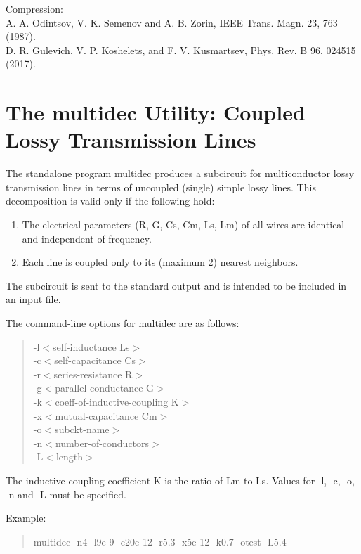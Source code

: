 Compression:\\
A. A. Odintsov, V. K. Semenov and A. B. Zorin, IEEE Trans. Magn. 23, 763
 (1987).\\
D. R. Gulevich, V. P. Koshelets, and F. V. Kusmartsev, Phys. Rev. B 96,
  024515 (2017).

\section{The {\vt multidec} Utility: Coupled Lossy Transmission Lines}


The standalone program {\vt multidec} produces a subcircuit for
multiconductor lossy transmission lines in terms of uncoupled (single)
simple lossy lines.  This decomposition is valid only if the following
hold:

\begin{enumerate}
\item{The electrical parameters (R, G, Cs, Cm, Ls, Lm) of all wires are
 identical and independent of frequency.}
\item{Each line is coupled only to its (maximum 2) nearest neighbors.}
\end{enumerate}

The subcircuit is sent to the standard output and is intended to be
included in an input file.

The command-line options for {\vt multidec} are as follows:
\begin{quote}
{\vt -l}$<$self-inductance Ls$>$\\
{\vt -c}$<$self-capacitance Cs$>$\\
{\vt -r}$<$series-resistance R$>$\\
{\vt -g}$<$parallel-conductance G$>$\\
{\vt -k}$<$coeff-of-inductive-coupling K$>$\\
{\vt -x}$<$mutual-capacitance Cm$>$\\
{\vt -o}$<$subckt-name$>$\\
{\vt -n}$<$number-of-conductors$>$\\
{\vt -L}$<$length$>$
\end{quote}

The inductive coupling coefficient K is the ratio of Lm
to Ls. Values for -l, -c, -o, -n and -L must be specified.

Example:
\begin{quote}
{\vt multidec -n4 -l9e-9 -c20e-12 -r5.3 -x5e-12 -k0.7 -otest -L5.4}
\end{quote}

